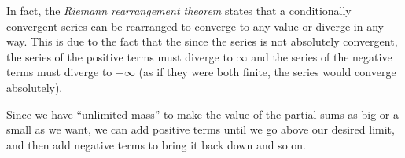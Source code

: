 \documentclass[../main.tex]{subfiles}
\begin{document}
\begin{remark}
  \nonexaminable
  In fact, the \textit{Riemann rearrangement theorem} states that a conditionally convergent series can be rearranged to converge to any value or diverge in any way.
  This is due to the fact that the since the series is not absolutely convergent, the series of the positive terms must diverge to $\infty$ and the series of the negative terms must diverge to $-\infty$ (as if they were both finite, the series would converge absolutely).

  Since we have ``unlimited mass'' to make the value of the partial sums as big or a small as we want, we can add positive terms until we go above our desired limit, and then add negative terms to bring it back down and so on.
\end{remark}
\end{document}

